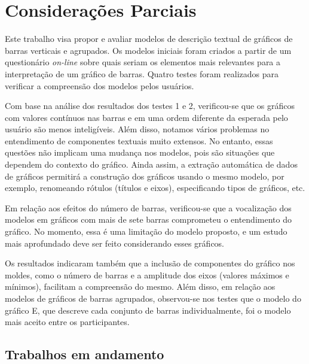 \documentclass[
	12pt,				%
	openright,			%
	oneside,			%
	a4paper,			%
	english,			%
	brazil				%
	]{abntex2}
\begin{document}
\chapter{Considerações Parciais}

Este trabalho visa propor e avaliar modelos de descrição textual de gráficos de barras verticais e agrupados. Os modelos iniciais foram criados a partir de um questionário \textit{on-line} sobre quais seriam os elementos mais relevantes para a interpretação de um gráfico de barras. Quatro testes foram realizados para verificar a compreensão dos modelos pelos usuários.

Com base na análise dos resultados dos testes 1 e 2, verificou-se que os gráficos com valores contínuos nas barras e em uma ordem diferente da esperada pelo usuário são menos inteligíveis. Além disso, notamos vários problemas no entendimento de componentes textuais muito extensos. No entanto, essas questões não implicam uma mudança nos modelos, pois são situações que dependem do contexto do gráfico. Ainda assim, a extração automática de dados de gráficos permitirá a construção dos gráficos usando o mesmo modelo, por exemplo, renomeando rótulos (títulos e eixos), especificando tipos de gráficos, etc.

Em relação aos efeitos do número de barras, verificou-se que a vocalização dos modelos em gráficos com mais de sete barras comprometeu o entendimento do gráfico. No momento, essa é uma limitação do modelo proposto, e um estudo mais aprofundado deve ser feito considerando esses gráficos.

Os resultados indicaram também que a inclusão de componentes do gráfico nos moldes, como o número de barras e a amplitude dos eixos (valores máximos e mínimos), facilitam a compreensão do mesmo. Além disso, em relação aos modelos de gráficos de barras agrupados, observou-se nos testes que o modelo do gráfico E, que descreve cada conjunto de barras individualmente, foi o modelo mais aceito entre os participantes.

\section{Trabalhos em andamento}

\end{document}
